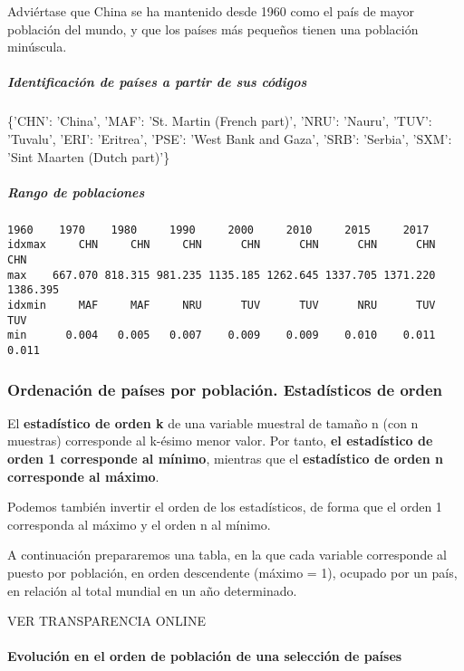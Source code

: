 \documentclass[11pt]{article}
\begin{document}
Adviértase que China se ha mantenido desde 1960 como el país de mayor
población del mundo, y que los países más pequeños tienen una población
minúscula.

            
    \subparagraph{Identificación de países a partir de sus
códigos}\label{identificaciuxf3n-de-pauxedses-a-partir-de-sus-cuxf3digos}

\{'CHN': 'China',
 'MAF': 'St. Martin (French part)',
 'NRU': 'Nauru',
 'TUV': 'Tuvalu',
 'ERI': 'Eritrea',
 'PSE': 'West Bank and Gaza',
 'SRB': 'Serbia',
 'SXM': 'Sint Maarten (Dutch part)'\}
            
    \subparagraph{Rango de poblaciones}\label{rango-de-poblaciones}

    \begin{Verbatim}[commandchars=\\\{\}]
          1960    1970    1980     1990     2000     2010     2015     2017
idxmax     CHN     CHN     CHN      CHN      CHN      CHN      CHN      CHN
max    667.070 818.315 981.235 1135.185 1262.645 1337.705 1371.220 1386.395
idxmin     MAF     MAF     NRU      TUV      TUV      NRU      TUV      TUV
min      0.004   0.005   0.007    0.009    0.009    0.010    0.011    0.011

    \end{Verbatim}

            
    \subsubsection*{Ordenación de países por población. Estadísticos de
orden}\label{ordenaciuxf3n-de-pauxedses-por-poblaciuxf3n.-estaduxedsticos-de-orden}

El \textbf{estadístico de orden k} de una variable muestral de tamaño n
(con n muestras) corresponde al k-ésimo menor valor. Por tanto,
\textbf{el estadístico de orden 1 corresponde al mínimo}, mientras que
el \textbf{estadístico de orden n corresponde al máximo}.

Podemos también invertir el orden de los estadísticos, de forma que el
orden 1 corresponda al máximo y el orden n al mínimo.

A continuación prepararemos una tabla, en la que cada variable
corresponde al puesto por población, en orden descendente (máximo = 1),
ocupado por un país, en relación al total mundial en un año determinado.

VER TRANSPARENCIA ONLINE
            
    \paragraph{Evolución en el orden de población de una selección de
países}\label{evoluciuxf3n-en-el-orden-de-poblaciuxf3n-de-una-selecciuxf3n-de-pauxedses}
\end{document}
